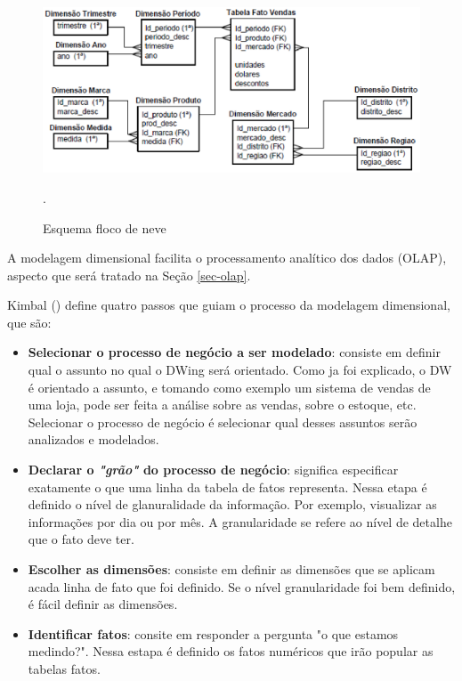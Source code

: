  \begin{figure}[!htb]
 	\centering
 		\includegraphics[scale=0.8]{figuras/dw-modelo-flocodeneve}
 		\caption{Esquema floco de neve}.
 		\label{dw-snowflackscheme}
 \end{figure}

%

A modelagem dimensional facilita o processamento analítico dos dados (OLAP), aspecto que será tratado na Seção \ref{sec-olap}.

%

 Kimbal (\citeyear{kimball2002}) define quatro passos que guiam o processo da modelagem dimensional, que são:


 \begin{itemize}
 	\item \textbf{Selecionar o processo de negócio a ser modelado}: consiste em definir qual o assunto no qual o DWing será orientado. Como ja foi explicado, o DW é orientado a assunto, e tomando como exemplo um sistema de vendas de uma loja, pode ser feita a análise sobre as vendas, sobre o estoque, etc. Selecionar o processo de negócio é selecionar qual desses assuntos serão analizados e modelados.
 	\item \textbf{Declarar o \emph{"grão"} do processo de negócio}: significa especificar exatamente o que uma linha da tabela de fatos representa. Nessa etapa é definido o nível de glanuralidade da informação. Por exemplo, visualizar as informações por dia ou por mês. A granularidade se refere ao nível de detalhe que o fato deve ter. 
 	\item \textbf{Escolher as dimensões}: consiste em definir as dimensões que se aplicam acada linha de fato que foi definido. Se o nível granularidade foi bem definido, é fácil definir as dimensões. 
 	\item \textbf{Identificar fatos}: consite em responder a pergunta "o que estamos medindo?". Nessa estapa é definido os fatos numéricos que irão popular as tabelas fatos.	  
 \end{itemize}

